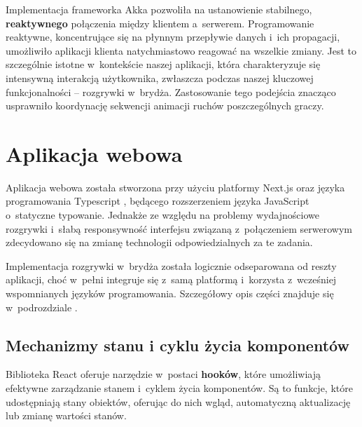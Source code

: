 Implementacja frameworka Akka \cite{Akka} pozwoliła na ustanowienie stabilnego,
\textbf{reaktywnego} połączenia między klientem a~serwerem. Programowanie
reaktywne, koncentrujące się na płynnym przepływie danych i~ich propagacji,
umożliwiło aplikacji klienta natychmiastowo reagować na wszelkie zmiany. Jest
to szczególnie istotne w~kontekście naszej aplikacji, która charakteryzuje
się intensywną interakcją użytkownika, zwłaszcza podczas naszej kluczowej
funkcjonalności -- rozgrywki w~brydża. Zastosowanie tego podejścia
znacząco usprawniło koordynację sekwencji animacji ruchów poszczególnych
graczy.


\section{Aplikacja webowa}
Aplikacja webowa została stworzona przy użyciu platformy Next.js
\cite{NextJS} oraz języka programowania Typescript \cite{Typescript},
będącego rozszerzeniem języka JavaScript o~statyczne typowanie.
Jednakże ze względu na problemy wydajnościowe rozgrywki
i~słabą responsywność interfejsu związaną z~połączeniem serwerowym
zdecydowano się na zmianę technologii odpowiedzialnych za te zadania.

Implementacja rozgrywki w~brydża została logicznie
odseparowana od reszty aplikacji, choć w~pełni integruje się z~samą
platformą i~korzysta z~wcześniej wspomnianych języków programowania.
Szczegółowy opis części znajduje się w~podrozdziale .

\subsection{Mechanizmy stanu i cyklu życia komponentów}
Biblioteka React oferuje narzędzie w~postaci \textbf{hooków},
które umożliwiają efektywne zarządzanie stanem i~cyklem życia komponentów.
Są to funkcje, które udostępniają stany obiektów, oferując do nich wgląd, automatyczną aktualizację
lub zmianę wartości stanów.

